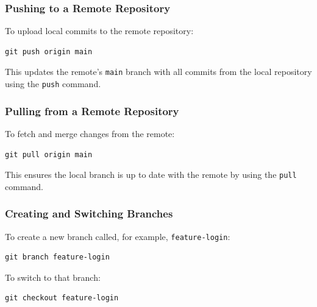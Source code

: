 \documentclass{article}
\newcommand{\codecmd}[1]{\textcolor[rgb]{0,0.5,0}{\texttt{#1}}}
\begin{document}
\subsubsection{Pushing to a Remote Repository}

To upload local commits to the remote repository:

\begin{tcolorbox}[colback=mintgreen, colframe=green!40!black, boxrule=0.5pt, sharp corners]
\begin{verbatim}
git push origin main
\end{verbatim}
\end{tcolorbox}

\noindent This updates the remote’s \codecmd{main} branch with all commits from the local repository using the \codecmd{push} command.

\subsubsection{Pulling from a Remote Repository}

To fetch and merge changes from the remote:

\begin{tcolorbox}[colback=mintgreen, colframe=green!40!black, boxrule=0.5pt, sharp corners]
\begin{verbatim}
git pull origin main
\end{verbatim}
\end{tcolorbox}

\noindent This ensures the local branch is up to date with the remote by using the \codecmd{pull} command.

\subsubsection{Creating and Switching Branches}

To create a new branch called, for example, \codecmd{feature-login}:

\begin{tcolorbox}[colback=mintgreen, colframe=green!40!black, boxrule=0.5pt, sharp corners]
\begin{verbatim}
git branch feature-login
\end{verbatim}
\end{tcolorbox}

\noindent To switch to that branch:

\begin{tcolorbox}[colback=mintgreen, colframe=green!40!black, boxrule=0.5pt, sharp corners]
\begin{verbatim}
git checkout feature-login
\end{verbatim}
\end{tcolorbox}
\end{document}
